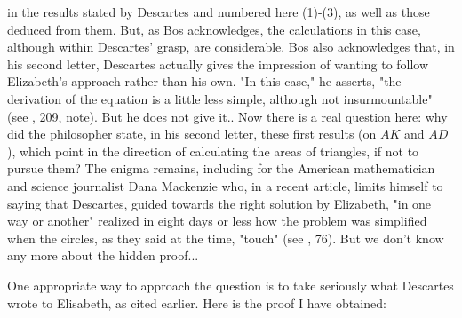 \documentclass[12pt]{article}
\theoremstyle{définition}
\theoremstyle{remark}
\theoremstyle{plain}
\theoremstyle{plain}
\begin{document}
{in the results stated by Descartes and numbered here (1)-(3), as well as those deduced from them. But, as Bos acknowledges, the calculations in this case, although within Descartes' grasp, are considerable. Bos also acknowledges that, in his second letter, Descartes actually gives the impression of wanting to follow Elizabeth's approach rather than his own. "In this case," he asserts, "the derivation of the equation is a little less simple, although not insurmountable" (see \cite{Bos1}, 209, note). But he does not give it.}. Now there is a real question here: why did the philosopher state, in his second letter, these first results (on $AK$ and $AD$), which point in the direction of calculating the areas of triangles, if not to pursue them? The enigma remains, including for the American mathematician and science journalist Dana Mackenzie who, in a recent article, limits himself to saying that Descartes, guided towards the right solution by Elizabeth, "in one way or another" realized in eight days or less how the problem was simplified when the circles, as they said at the time, "touch" (see \cite{Mac}, 76). But we don't know any more about the hidden proof...

One appropriate way to approach the question is to take seriously what Descartes wrote to Elisabeth, as cited earlier. Here is the proof I have obtained:
\end{document}
